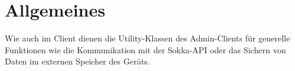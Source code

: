 \section{Allgemeines}

Wie auch im Client dienen die Utility-Klassen des Admin-Clients für generelle Funktionen 
wie die Kommunikation mit der Sokka-API oder das Sichern von Daten im externen Speicher
des Geräts.